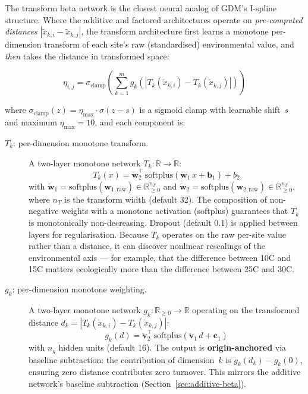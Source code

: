 \documentclass{article}
\begin{document}
The transform beta network is the closest neural analog of GDM's I-spline structure. Where the additive and factored architectures operate on \emph{pre-computed distances} $|\tilde{x}_{k,i} - \tilde{x}_{k,j}|$, the transform architecture first learns a monotone per-dimension transform of each site's raw (standardised) environmental value, and \emph{then} takes the distance in transformed space:

\begin{equation}
    \eta_{i,j} = \sigma_{\text{clamp}}\!\left(\sum_{k=1}^{m} g_k\!\left(\left|T_k(\tilde{x}_{k,i}) - T_k(\tilde{x}_{k,j})\right|\right)\right)
    \label{eq:transform-beta}
\end{equation}

where $\sigma_{\text{clamp}}(z) = \eta_{\max} \cdot \sigma(z - s)$ is a sigmoid clamp with learnable shift~$s$ and maximum $\eta_{\max} = 10$, and each component is:

\begin{description}
    \item[$T_k$: per-dimension monotone transform.] A two-layer monotone network $T_k: \mathbb{R} \to \mathbb{R}$:
    \begin{equation}
        T_k(x) = \tilde{\mathbf{w}}_2^\top\,\text{softplus}\!\left(\tilde{\mathbf{w}}_1\,x + \mathbf{b}_1\right) + b_2
    \end{equation}
    with $\tilde{\mathbf{w}}_1 = \text{softplus}(\mathbf{w}_{1,\text{raw}}) \in \mathbb{R}_{\geq 0}^{n_T}$ and $\tilde{\mathbf{w}}_2 = \text{softplus}(\mathbf{w}_{2,\text{raw}}) \in \mathbb{R}_{\geq 0}^{n_T}$, where $n_T$ is the transform width (default 32). The composition of non-negative weights with a monotone activation (softplus) guarantees that $T_k$ is monotonically non-decreasing. Dropout (default 0.1) is applied between layers for regularisation. Because $T_k$ operates on the raw per-site value rather than a distance, it can discover nonlinear rescalings of the environmental axis --- for example, that the difference between 10\textdegree C and 15\textdegree C matters ecologically more than the difference between 25\textdegree C and 30\textdegree C.
    
    \item[$g_k$: per-dimension monotone weighting.] A two-layer monotone network $g_k: \mathbb{R}_{\geq 0} \to \mathbb{R}$ operating on the transformed distance $d_k = |T_k(\tilde{x}_{k,i}) - T_k(\tilde{x}_{k,j})|$:
    \begin{equation}
        g_k(d) = \tilde{\mathbf{v}}_2^\top\,\text{softplus}\!\left(\tilde{\mathbf{v}}_1\,d + \mathbf{c}_1\right)
    \end{equation}
    with $n_g$ hidden units (default 16). The output is \textbf{origin-anchored} via baseline subtraction: the contribution of dimension~$k$ is $g_k(d_k) - g_k(0)$, ensuring zero distance contributes zero turnover. This mirrors the additive network's baseline subtraction (Section~\ref{sec:additive-beta}).
\end{description}
\end{document}
